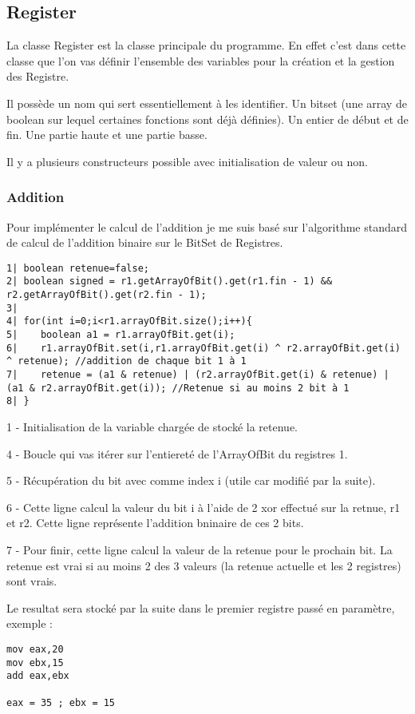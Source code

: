 \documentclass{article}
\begin{document}
\subsection{Register}
La classe Register est la classe principale du programme. En effet c'est dans cette classe que l'on vas définir l'ensemble des variables pour la création et la gestion des Registre.

Il possède un nom qui sert essentiellement à les identifier.
Un bitset (une array de boolean sur lequel certaines fonctions sont déjà définies).
Un entier de début et de fin.
Une partie haute et une partie basse.

Il y a plusieurs constructeurs possible avec initialisation de valeur ou non.

\subsubsection{Addition}
Pour implémenter le calcul de l'addition je me suis basé sur l'algorithme standard de calcul de l'addition binaire sur le BitSet de Registres.

\begin{verbatim}
1| boolean retenue=false;
2| boolean signed = r1.getArrayOfBit().get(r1.fin - 1) && r2.getArrayOfBit().get(r2.fin - 1);
3|
4| for(int i=0;i<r1.arrayOfBit.size();i++){
5|    boolean a1 = r1.arrayOfBit.get(i);
6|    r1.arrayOfBit.set(i,r1.arrayOfBit.get(i) ^ r2.arrayOfBit.get(i) ^ retenue); //addition de chaque bit 1 à 1
7|    retenue = (a1 & retenue) | (r2.arrayOfBit.get(i) & retenue) | (a1 & r2.arrayOfBit.get(i)); //Retenue si au moins 2 bit à 1
8| }
\end{verbatim}

1 - Initialisation de la variable chargée de stocké la retenue.

4 - Boucle qui vas itérer sur l'entiereté de l'ArrayOfBit du registres 1.

5 - Récupération du bit avec comme index i (utile car modifié par la suite).

6 - Cette ligne calcul la valeur du bit i à l'aide de 2 xor effectué sur la retnue, r1 et r2. Cette ligne représente l'addition bninaire de ces 2 bits.

7 - Pour finir, cette ligne calcul la valeur de la retenue pour le prochain bit. La retenue est vrai si au moins 2 des 3 valeurs (la retenue actuelle et les 2 registres) sont vrais.

Le resultat sera stocké par la suite dans le premier registre passé en paramètre, exemple :
\begin{verbatim}
mov eax,20
mov ebx,15
add eax,ebx

eax = 35 ; ebx = 15
\end{verbatim}
\end{document}
